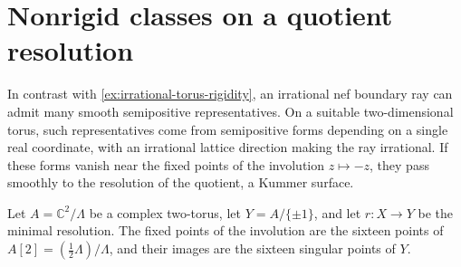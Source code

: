 \section{Nonrigid classes on a quotient resolution}
\label{sec:kummer-boundary-classes}

In contrast with \cref{ex:irrational-torus-rigidity}, an irrational nef boundary ray can admit many smooth semipositive representatives. On a suitable two-dimensional torus, such representatives come from semipositive forms depending on a single real coordinate, with an irrational lattice direction making the ray irrational. If these forms vanish near the fixed points of the involution $z\mapsto-z$, they pass smoothly to the resolution of the quotient, a Kummer surface.

Let $A=\mathbb C^2/\Lambda$ be a complex two-torus, let $Y=A/\{\pm1\}$, and let $r\colon X\to Y$ be the minimal resolution. The fixed points of the involution are the sixteen points of $A[2]=(\frac12\Lambda)/\Lambda$, and their images are the sixteen singular points of $Y$.

